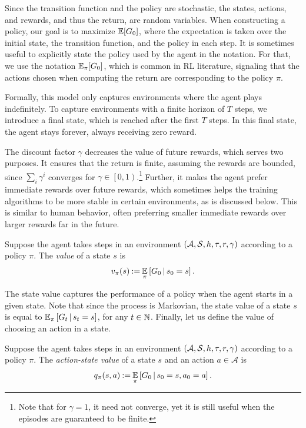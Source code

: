 Since the transition function and the policy are stochastic, the states, actions, and rewards, and thus the return, are random variables.
When constructing a policy, our goal is to maximize $ \operatorname*{\mathbb{E}}\!\left[ G_0 \right] $, where the expectation is taken over the initial state, the transition function, and the policy in each step.
It is sometimes useful to explicitly state the policy used by the agent in the notation.
For that, we use the notation $ \operatorname*{\mathbb{E}}_\pi\!\left[ G_0 \right] $, which is common in RL literature, signaling that the actions chosen when computing the return are corresponding to the policy $ \pi $.

Formally, this model only captures environments where the agent plays indefinitely.
To capture environments with a finite horizon of $ T $ steps, we introduce a final state, which is reached after the first $ T $ steps.
In this final state, the agent stays forever, always receiving zero reward.

The discount factor $ \gamma $ decreases the value of future rewards, which serves two purposes.
It ensures that the return is finite, assuming the rewards are bounded, since $ \sum_i \gamma^i $ converges for $ \gamma \in \left[ 0,1 \right) $.\footnote{Note that for $ \gamma = 1 $, it need not converge, yet it is still useful when the episodes are guaranteed to be finite.}
Further, it makes the agent prefer immediate rewards over future rewards, which sometimes helps the training algorithms to be more stable in certain environments, as is discussed below.
This is similar to human behavior, often preferring smaller immediate rewards over larger rewards far in the future.

\begin{defi}\label{def:state-value}
	Suppose the agent takes steps in an environment $ \left( \mathcal{A}, \mathcal{S}, h, \tau, r, \gamma \right) $ according to a policy $ \pi $.
	The \emph{value} of a state $ s $ is \[
		v_{\pi}\!\left(s\right) \mathbin{:=} \operatorname*{\mathbb{E}}_\pi \left[ G_0 \,|\, s_0 = s \right].
	\]
\end{defi}

The state value captures the performance of a policy when the agent starts in a given state.
Note that since the process is Markovian, the state value of a state $ s $ is equal to $ \operatorname*{\mathbb{E}}_\pi \left[ G_t \,|\, s_t = s \right] $, for any $ t \in \mathbb{N} $.
Finally, let us define the value of choosing an action in a state.

\begin{defi}
	Suppose the agent takes steps in an environment $ \left( \mathcal{A}, \mathcal{S}, h, \tau, r, \gamma \right) $ according to a policy $ \pi $.
	The \emph{action-state value} of a state $ s $ and an action $ a \in\mathcal{A} $ is \[
		q_\pi\!\left(s, a\right) \mathbin{:=} \operatorname*{\mathbb{E}}_\pi \left[ G_0 \,|\, s_0 = s, a_0 = a \right].
	\]
\end{defi}

